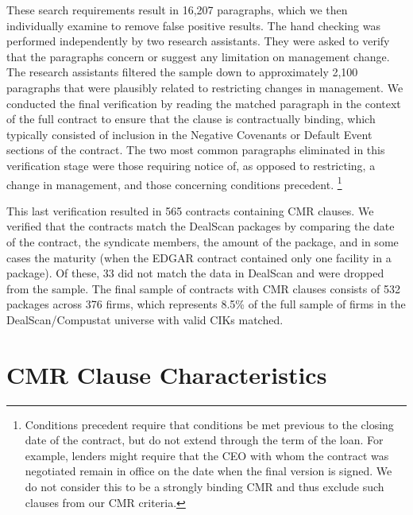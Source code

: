 \documentclass[12pt]{article}
\begin{document}
\begin{appendices}
These search requirements result in 16,207 paragraphs, which we then individually examine to remove false positive results.
The hand checking was performed independently by two research assistants.
They were asked to verify that the paragraphs concern or suggest any limitation on management change.
The research assistants filtered the sample down to approximately 2,100 paragraphs that were plausibly related to restricting changes in management.
We conducted the final verification by reading the matched paragraph in the context of the full contract to ensure that the clause is contractually binding, which typically consisted of inclusion in the Negative Covenants or Default Event sections of the contract.
The two most common paragraphs eliminated in this verification stage were those requiring notice of, as opposed to restricting, a change in management, and those concerning conditions precedent.%
    \footnote{Conditions precedent require that conditions be met previous to the closing date of the contract, but do not extend through the term of the loan. For example, lenders might require that the CEO with whom the contract was negotiated remain in office on the date when the final version is signed. We do not consider this to be a strongly binding CMR and thus exclude such clauses from our CMR criteria.}


This last verification resulted in 565 contracts containing CMR clauses.
We verified that the contracts match the DealScan packages by comparing the date of the contract, the syndicate members, the amount of the package, and in some cases the maturity (when the EDGAR contract contained only one facility in a package).
Of these, 33 did not match the data in DealScan and were dropped from the sample.
The final sample of contracts with CMR clauses consists of 532 packages across 376 firms, which represents 8.5\% of the full sample of firms in the DealScan/Compustat universe with valid CIKs matched.



\section{CMR Clause Characteristics}
\label{IApp:cmr_characteristics}


\end{appendices}
\end{document}
